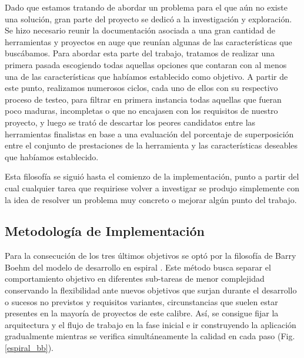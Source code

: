 Dado que estamos tratando de abordar un problema para el que aún no existe una solución, gran parte del proyecto se dedicó a la investigación y exploración. Se hizo necesario reunir la documentación asociada a una gran cantidad de herramientas y proyectos en auge que reunían algunas de las características que buscábamos. Para abordar esta parte del trabajo, tratamos de realizar una primera pasada escogiendo todas aquellas opciones que contaran con al menos una de las características que habíamos establecido como objetivo. A partir de este punto, realizamos numerosos ciclos, cada uno de ellos con su respectivo proceso de testeo, para filtrar en primera instancia todas aquellas que fueran poco maduras, incompletas o que no encajasen con los requisitos de nuestro proyecto, y luego se trató de descartar los peores candidatos entre las herramientas finalistas en base a una evaluación del porcentaje de superposición entre el conjunto de prestaciones de la herramienta y las características deseables que habíamos establecido.

Esta filosofía se siguió hasta el comienzo de la implementación, punto a partir del cual cualquier tarea que requiriese volver a investigar se produjo simplemente con la idea de resolver un problema muy concreto o mejorar algún punto del trabajo.

\subsection{Metodología de Implementación}

Para la consecución de los tres últimos objetivos se optó por la filosofía de Barry Boehm del modelo de desarrollo en espiral \cite{BB1986}. Este método busca separar el comportamiento objetivo en diferentes sub-tareas de menor complejidad conservando la flexibilidad ante nuevos objetivos que surjan durante el desarrollo o sucesos no previstos y requisitos variantes, circunstancias que suelen estar presentes en la mayoría de proyectos de este calibre. Así, se consigue fijar la arquitectura y el flujo de trabajo en la fase inicial e ir construyendo la aplicación gradualmente mientras se verifica simultáneamente la calidad en cada paso (Fig. \ref{espiral_bb}).

